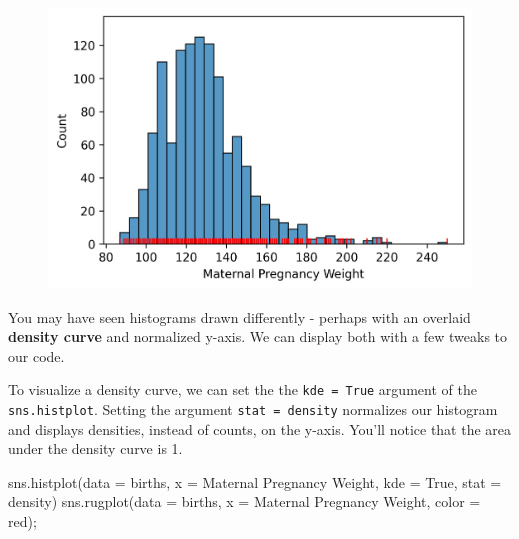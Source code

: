 \documentclass[
  letterpaper,
  DIV=11,
  numbers=noendperiod]{scrreprt}
\newenvironment{Shaded}{\begin{snugshade}}{\end{snugshade}}
\newcommand{\NormalTok}[1]{\textcolor[rgb]{0.00,0.23,0.31}{#1}}
\newcommand{\OperatorTok}[1]{\textcolor[rgb]{0.37,0.37,0.37}{#1}}
\newcommand{\StringTok}[1]{\textcolor[rgb]{0.13,0.47,0.30}{#1}}
\newcommand{\VariableTok}[1]{\textcolor[rgb]{0.07,0.07,0.07}{#1}}
\begin{document}
\begin{figure}[H]

{\centering \includegraphics{visualization_1/visualization_1_files/figure-pdf/cell-9-output-1.png}

}

\end{figure}

You may have seen histograms drawn differently - perhaps with an
overlaid \textbf{density curve} and normalized y-axis. We can display
both with a few tweaks to our code.

To visualize a density curve, we can set the the \texttt{kde\ =\ True}
argument of the \texttt{sns.histplot}. Setting the argument
\texttt{stat\ =\ \textquotesingle{}density\textquotesingle{}} normalizes
our histogram and displays densities, instead of counts, on the y-axis.
You'll notice that the area under the density curve is 1.

\begin{Shaded}
\begin{Highlighting}[]
\NormalTok{sns.histplot(data }\OperatorTok{=}\NormalTok{ births, x }\OperatorTok{=} \StringTok{\textquotesingle{}Maternal Pregnancy Weight\textquotesingle{}}\NormalTok{, kde }\OperatorTok{=} \VariableTok{True}\NormalTok{, }
\NormalTok{             stat }\OperatorTok{=} \StringTok{\textquotesingle{}density\textquotesingle{}}\NormalTok{)}
\NormalTok{sns.rugplot(data }\OperatorTok{=}\NormalTok{ births, x }\OperatorTok{=} \StringTok{\textquotesingle{}Maternal Pregnancy Weight\textquotesingle{}}\NormalTok{, color }\OperatorTok{=} \StringTok{\textquotesingle{}red\textquotesingle{}}\NormalTok{)}\OperatorTok{;}
\end{Highlighting}
\end{Shaded}
\end{document}
